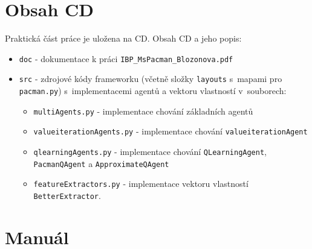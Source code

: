 \chapter{Obsah CD}
Praktická část práce je uložena na CD. Obsah CD a jeho popis:
\begin{itemize}
\item \texttt{doc} - dokumentace k práci \texttt{IBP\_MsPacman\_Blozonova.pdf}
\item \texttt{src} - zdrojové kódy frameworku (včetně složky \texttt{layouts} s~mapami pro \texttt{pacman.py}) s~implementacemi agentů a vektoru vlastností v~souborech:
\begin{itemize}
\item \texttt{multiAgents.py} - implementace chování základních agentů
\item \texttt{valueiterationAgents.py} - implementace chování \texttt{valueiterationAgent}
\item \texttt{qlearningAgents.py} - implementace chování \texttt{QLearningAgent}, \texttt{PacmanQAgent} a \texttt{ApproximateQAgent}
\item \texttt{featureExtractors.py} - implementace vektoru vlastností \texttt{BetterExtractor}.
\end{itemize}
\end{itemize}

\chapter{Manuál}
\label{priloha:manual}
